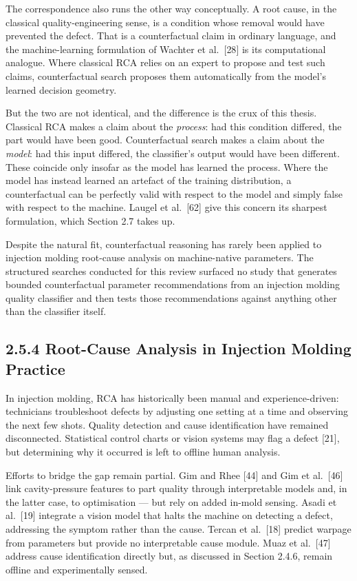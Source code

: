 The correspondence also runs the other way conceptually. A root cause, in the classical quality-engineering sense, is a condition whose removal would have prevented the defect. That is a counterfactual claim in ordinary language, and the machine-learning formulation of Wachter et al.~{[}28{]} is its computational analogue. Where classical RCA relies on an expert to propose and test such claims, counterfactual search proposes them automatically from the model's learned decision geometry.

But the two are not identical, and the difference is the crux of this thesis. Classical RCA makes a claim about the \emph{process}: had this condition differed, the part would have been good. Counterfactual search makes a claim about the \emph{model}: had this input differed, the classifier's output would have been different. These coincide only insofar as the model has learned the process. Where the model has instead learned an artefact of the training distribution, a counterfactual can be perfectly valid with respect to the model and simply false with respect to the machine. Laugel et al.~{[}62{]} give this concern its sharpest formulation, which Section 2.7 takes up.

Despite the natural fit, counterfactual reasoning has rarely been applied to injection molding root-cause analysis on machine-native parameters. The structured searches conducted for this review surfaced no study that generates bounded counterfactual parameter recommendations from an injection molding quality classifier and then tests those recommendations against anything other than the classifier itself.

\hypertarget{root-cause-analysis-in-injection-molding-practice}{%
\subsection{2.5.4 Root-Cause Analysis in Injection Molding Practice}\label{root-cause-analysis-in-injection-molding-practice}}

In injection molding, RCA has historically been manual and experience-driven: technicians troubleshoot defects by adjusting one setting at a time and observing the next few shots. Quality detection and cause identification have remained disconnected. Statistical control charts or vision systems may flag a defect {[}21{]}, but determining why it occurred is left to offline human analysis.

Efforts to bridge the gap remain partial. Gim and Rhee {[}44{]} and Gim et al.~{[}46{]} link cavity-pressure features to part quality through interpretable models and, in the latter case, to optimisation --- but rely on added in-mold sensing. Asadi et al.~{[}19{]} integrate a vision model that halts the machine on detecting a defect, addressing the symptom rather than the cause. Tercan et al.~{[}18{]} predict warpage from parameters but provide no interpretable cause module. Muaz et al.~{[}47{]} address cause identification directly but, as discussed in Section 2.4.6, remain offline and experimentally sensed.

